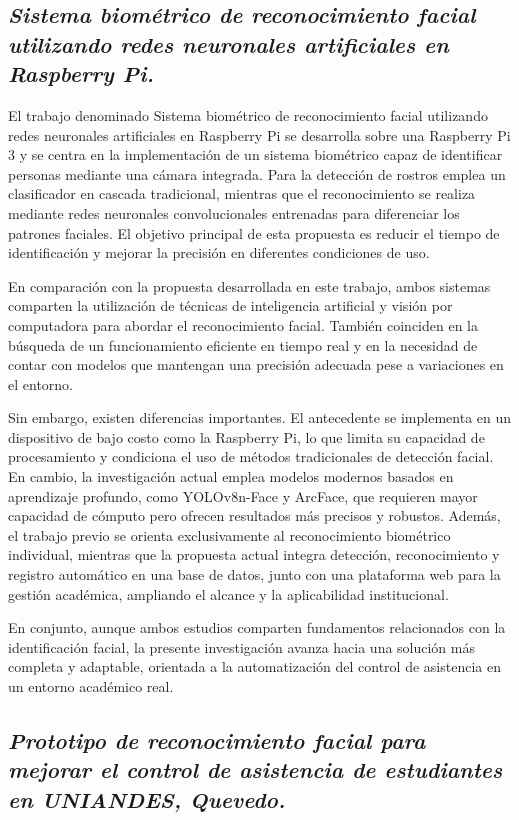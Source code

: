 \subsection*{\textit{Sistema biométrico de reconocimiento facial utilizando redes neuronales artificiales en Raspberry Pi.}}

El trabajo denominado Sistema biométrico de reconocimiento facial utilizando redes neuronales artificiales en Raspberry Pi se desarrolla sobre una Raspberry Pi 3 y se centra en la implementación de un sistema biométrico capaz de identificar personas mediante una cámara integrada. Para la detección de rostros emplea un clasificador en cascada tradicional, mientras que el reconocimiento se realiza mediante redes neuronales convolucionales entrenadas para diferenciar los patrones faciales. El objetivo principal de esta propuesta es reducir el tiempo de identificación y mejorar la precisión en diferentes condiciones de uso\cite{sistemaBiometricoRaspberry}.

En comparación con la propuesta desarrollada en este trabajo, ambos sistemas comparten la utilización de técnicas de inteligencia artificial y visión por computadora para abordar el reconocimiento facial. También coinciden en la búsqueda de un funcionamiento eficiente en tiempo real y en la necesidad de contar con modelos que mantengan una precisión adecuada pese a variaciones en el entorno.

Sin embargo, existen diferencias importantes. El antecedente se implementa en un dispositivo de bajo costo como la Raspberry Pi, lo que limita su capacidad de procesamiento y condiciona el uso de métodos tradicionales de detección facial. En cambio, la investigación actual emplea modelos modernos basados en aprendizaje profundo, como YOLOv8n-Face y ArcFace, que requieren mayor capacidad de cómputo pero ofrecen resultados más precisos y robustos. Además, el trabajo previo se orienta exclusivamente al reconocimiento biométrico individual, mientras que la propuesta actual integra detección, reconocimiento y registro automático en una base de datos, junto con una plataforma web para la gestión académica, ampliando el alcance y la aplicabilidad institucional.

En conjunto, aunque ambos estudios comparten fundamentos relacionados con la identificación facial, la presente investigación avanza hacia una solución más completa y adaptable, orientada a la automatización del control de asistencia en un entorno académico real.
\sloppy 
\subsection*{\textit{Prototipo de reconocimiento facial para mejorar el control de asistencia de estudiantes en UNIANDES, Quevedo.}}

